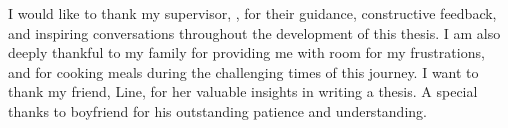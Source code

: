 I would like to thank my supervisor, \SupervisorName, for their guidance, constructive feedback, and inspiring conversations throughout the development of this thesis. I am also deeply thankful to my family for providing me with room for my frustrations, and for cooking meals during the challenging times of this journey. I want to thank my friend, Line, for her valuable insights in writing a thesis. A special thanks to boyfriend for his outstanding patience and understanding.